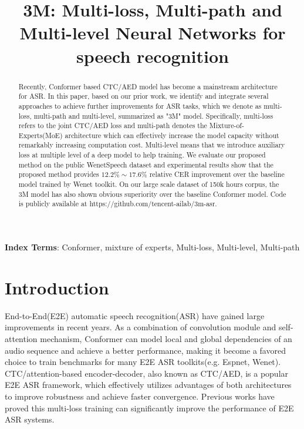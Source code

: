 \documentclass[a4paper]{article}
\title{3M: Multi-loss, Multi-path and Multi-level Neural Networks for speech recognition}
\begin{document}
\maketitle

\begin{abstract}
Recently, Conformer based CTC/AED model has become a mainstream architecture for ASR. In this paper, based on our prior work, we identify and integrate several approaches to achieve further improvements for ASR tasks, which we denote as multi-loss, multi-path and multi-level, summarized as "3M" model. Specifically, multi-loss refers to the joint CTC/AED loss and multi-path denotes the Mixture-of-Experts(MoE) architecture which can effectively increase the model capacity without remarkably increasing computation cost. Multi-level means that we introduce auxiliary loss at multiple level of a deep model to help training.
We evaluate our proposed method on the public WenetSpeech dataset and experimental results show that the proposed method provides $ 12.2\% \sim 17.6\% $ relative CER improvement over the baseline model trained by Wenet toolkit. On our large scale dataset of 150k hours corpus, the 3M model has also shown obvious superiority over the baseline Conformer model. Code is publicly available at https://github.com/tencent-ailab/3m-asr.



\end{abstract}
\noindent\textbf{Index Terms}: Conformer, mixture of experts, Multi-loss, Multi-level, Multi-path

\renewcommand{\thefootnote}{\fnsymbol{footnote}}



\section{Introduction}
End-to-End(E2E) automatic speech recognition(ASR) have gained large improvements in recent years. As a combination of convolution module and self-attention mechanism, Conformer\cite{conformer} can model local and global dependencies of an audio sequence and achieve a better performance, making it become a favored choice to train benchmarks for many E2E ASR toolkits(e.g. Espnet\cite{watanabe2018espnet}, Wenet\cite{zhang2021wenet}). CTC/attention-based encoder-decoder, also known as CTC/AED, is a popular E2E ASR framework, which effectively utilizes advantages of both architectures to improve robustness and achieve faster convergence. Previous works\cite{DBLP:journals/corr/HoriWZC17,wu2019improving,watanabe2017hybrid,hori2017joint} have proved this multi-loss training can significantly improve the performance of E2E ASR systems.
\end{document}
